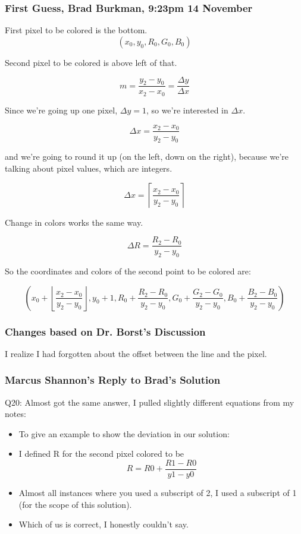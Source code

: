 \documentclass[11pt]{article}
\begin{document}
\begin{spacing}{1.2}
\subsubsection{First Guess, Brad Burkman, 9:23pm 14 November}

First pixel to be colored is the bottom.  
$$(x_0, y_0, R_0, G_0, B_0)$$

Second pixel to be colored is above left of that.  

$$m = \frac{y_2 - y_0}{x_2 - x_0} = \frac{\Delta y}{\Delta x}$$

Since we're going up one pixel, $\Delta y = 1$, so we're interested in $\Delta x$.  

$$\Delta x = \frac{x_2 - x_0}{y_2 - y_0}$$

and we're going to round it up (on the left, down on the right), because we're talking about pixel values, which are integers.  

$$\Delta x = \left\lceil\frac{x_2 - x_0}{y_2 - y_0}\right\rceil$$

Change in colors works the same way.  

$$\Delta R = \frac{R_2 - R_0}{y_2 - y_0}$$

So the coordinates and colors of the second point to be colored are:

$$\left( x_0 + \left\lfloor\frac{x_2 - x_0}{y_2 - y_0}\right\rfloor, 
y_0 + 1, 
R_0 + \frac{R_2 - R_0}{y_2 - y_0},
G_0 + \frac{G_2 - G_0}{y_2 - y_0},
B_0 + \frac{B_2 - B_0}{y_2 - y_0}
\right)$$

\subsubsection{Changes based on Dr. Borst's Discussion}

I realize I had forgotten about the offset between the line and the pixel.  

\subsubsection{Marcus Shannon's Reply to Brad's Solution}

Q20: Almost got the same answer, I pulled slightly different equations from my notes:
\begin{itemize}
    \item To give an example to show the deviation in our solution:
      \item I defined R for the second pixel colored to be
          $$R = R0 + \frac{R1 - R0}{y1 - y0}$$
    \item Almost all instances where you used a subscript of 2, I used a subscript of 1 (for the scope of this solution).
    \item Which of us is correct, I honestly couldn't say.
\end{itemize}


\end{spacing}
\end{document}
